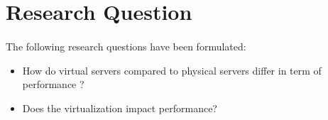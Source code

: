 \section{Research Question}
\paragraph{}
The following research questions have been formulated:
\begin{itemize}
	\item How do virtual servers compared to physical servers differ in term of performance ?
	\item Does the virtualization impact performance?
\end{itemize}
